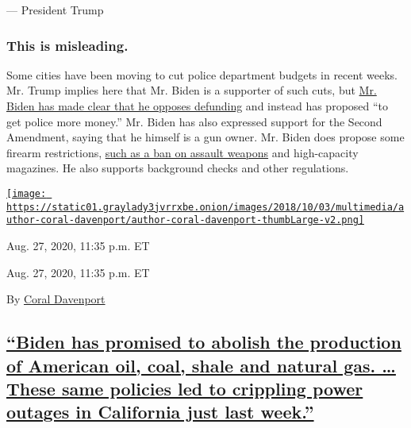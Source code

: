 --- President Trump

\hypertarget{this-is-misleading-}{%
\subsubsection{\texorpdfstring{\textbf{This is misleading.}
}{This is misleading. }}\label{this-is-misleading-}}

Some cities have been moving to cut police department budgets in recent
weeks. Mr. Trump implies here that Mr. Biden is a supporter of such
cuts, but
\href{https://slack-redir.net/link?url=https\%3A\%2F\%2Fwww.nytimes3xbfgragh.onion\%2F2020\%2F06\%2F08\%2Fus\%2Fpolitics\%2Fbiden-defund-the-police.html}{Mr.
Biden has made clear that he opposes defunding} and instead has proposed
``to get police more money.'' Mr. Biden has also expressed support for
the Second Amendment, saying that he himself is a gun owner. Mr. Biden
does propose some firearm restrictions,
\href{https://slack-redir.net/link?url=https\%3A\%2F\%2Fwww.nytimes3xbfgragh.onion\%2F2019\%2F08\%2F11\%2Fopinion\%2Fjoe-biden-ban-assault-weapons.html}{such
as a ban on assault weapons} and high-capacity magazines. He also
supports background checks and other regulations.

\href{https://www.nytimes3xbfgragh.onion/by/coral-davenport}{\texttt{[image: https://static01.graylady3jvrrxbe.onion/images/2018/10/03/multimedia/author-coral-davenport/author-coral-davenport-thumbLarge-v2.png]}}

Aug. 27, 2020, 11:35 p.m. ET

Aug. 27, 2020, 11:35 p.m. ET

By \href{https://www.nytimes3xbfgragh.onion/by/coral-davenport}{Coral
Davenport}

\hypertarget{biden-has-promised-to-abolish-the-production-of-american-oil-coal-shale-and-natural-gas--these-same-policies-led-to-crippling-power-outages-in-california-just-last-week}{%
\subsection{\texorpdfstring{\protect\hyperlink{biden-has-promised-to-abolish-the-production-of-american-oil-coal-shale-and-natural-gas-these-same-policies-led-to-crippling-pow}{``Biden
has promised to abolish the production of American oil, coal, shale and
natural gas. \ldots{} These same policies led to crippling power outages
in California just last
week.''}}{``Biden has promised to abolish the production of American oil, coal, shale and natural gas. \ldots{} These same policies led to crippling power outages in California just last week.''}}\label{biden-has-promised-to-abolish-the-production-of-american-oil-coal-shale-and-natural-gas--these-same-policies-led-to-crippling-power-outages-in-california-just-last-week}}

